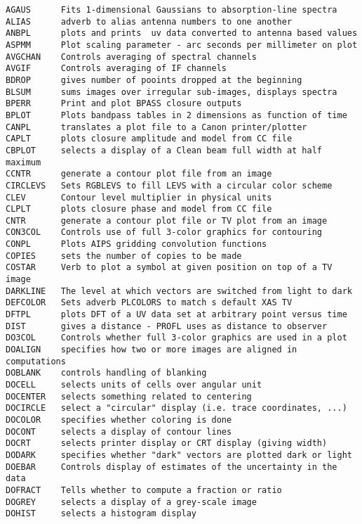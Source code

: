 \vfill\eject
{}

\vskip 0.5pt
\bbve\begin{verbatim}
AGAUS      Fits 1-dimensional Gaussians to absorption-line spectra
ALIAS      adverb to alias antenna numbers to one another
ANBPL      plots and prints  uv data converted to antenna based values
ASPMM      Plot scaling parameter - arc seconds per millimeter on plot
AVGCHAN    Controls averaging of spectral channels
AVGIF      Controls averaging of IF channels
BDROP      gives number of pooints dropped at the beginning
BLSUM      sums images over irregular sub-images, displays spectra
BPERR      Print and plot BPASS closure outputs
BPLOT      Plots bandpass tables in 2 dimensions as function of time
CANPL      translates a plot file to a Canon printer/plotter
CAPLT      plots closure amplitude and model from CC file
CBPLOT     selects a display of a Clean beam full width at half maximum
CCNTR      generate a contour plot file from an image
CIRCLEVS   Sets RGBLEVS to fill LEVS with a circular color scheme
CLEV       Contour level multiplier in physical units
CLPLT      plots closure phase and model from CC file
CNTR       generate a contour plot file or TV plot from an image
CON3COL    Controls use of full 3-color graphics for contouring
CONPL      Plots AIPS gridding convolution functions
COPIES     sets the number of copies to be made
COSTAR     Verb to plot a symbol at given position on top of a TV image
DARKLINE   The level at which vectors are switched from light to dark
DEFCOLOR   Sets adverb PLCOLORS to match s default XAS TV
DFTPL      plots DFT of a UV data set at arbitrary point versus time
DIST       gives a distance - PROFL uses as distance to observer
DO3COL     Controls whether full 3-color graphics are used in a plot
DOALIGN    specifies how two or more images are aligned in computations
DOBLANK    controls handling of blanking
DOCELL     selects units of cells over angular unit
DOCENTER   selects something related to centering
DOCIRCLE   select a "circular" display (i.e. trace coordinates, ...)
DOCOLOR    specifies whether coloring is done
DOCONT     selects a display of contour lines
DOCRT      selects printer display or CRT display (giving width)
DODARK     specifies whether "dark" vectors are plotted dark or light
DOEBAR     Controls display of estimates of the uncertainty in the data
DOFRACT    Tells whether to compute a fraction or ratio
DOGREY     selects a display of a grey-scale image
DOHIST     selects a histogram display

\end{verbatim}
